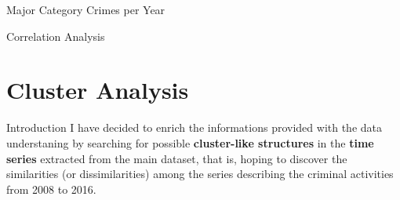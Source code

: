 \documentclass[12pt]{beamer}
\begin{document}
        \begin{frame}{Major Category Crimes per Year}
            \begin{figure}
                \centering
            \end{figure}
        \end{frame}

        \begin{frame}{Correlation Analysis}
            \begin{figure}
                \centering
            \end{figure}
        \end{frame}

    \section{Cluster Analysis} %
    \label{sec:cluster_analysis}
        \begin{frame}{Introduction}
            I have decided to enrich the informations provided with the data understaning by searching for
            possible \textbf{cluster-like structures} in the \textbf{time series} extracted from the main
            dataset, that is, hoping to discover the similarities (or dissimilarities) among the series
            describing the criminal activities from 2008 to 2016.
        \end{frame}
\end{document}
